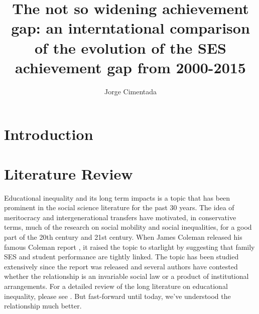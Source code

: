 \documentclass[11pt, a4paper]{article}\usepackage[]{graphicx}\usepackage[]{color}
\title{The not so widening achievement gap: an interntational comparison of the evolution of the SES achievement gap from 2000-2015}
\author{Jorge Cimentada}
\begin{document}
\setlength{\parindent}{2em}
\setlength{\parskip}{1em}

\maketitle





\tableofcontents












\section{Introduction}

\section{Literature Review}
Educational inequality and its long term impacts is a topic that has been prominent in the social science literature for the past 30 years. The idea of meritocracy and intergenerational transfers have motivated, in conservative terms, much of the research on social mobility and social inequalities, for a good part of the 20th century and 21st century. When James Coleman released his famous Coleman report \citep{coleman1966}, it raised the topic to starlight by suggesting that family SES and student performance are tightly linked. The topic has been studied extensively since the report was released and several authors have contested whether the relationship is an invariable social law or a product of institutional arrangements. For a detailed review of the long literature on educational inequality, please see \citet{gamoran2001}. But fast-forward until today, we've understood the relationship much better.
\end{document}

